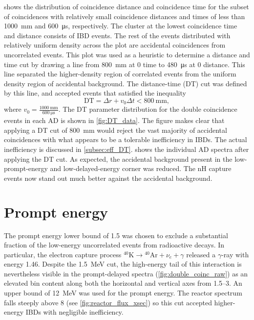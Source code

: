 shows the distribution of
coincidence distance and coincidence time
for the subset of  coincidences with
relatively small coincidence distances and times
of less than \SI{1000}{\milli\meter} and \SI{600}{\micro\second},
respectively.
The cluster at the lowest coincidence time and distance
consists of IBD events.
The rest of the events distributed with relatively uniform density
across the plot are accidental coincidences from uncorrelated events.
This plot was used as a heuristic to determine a distance and time cut
by drawing a line from \SI{800}{\milli\meter} at $0$ time
to \SI{480}{\micro\second} at $0$ distance.
This line separated the higher-density region
of correlated events from the uniform density region of accidental background.
The distance-time (DT) cut was defined by this line,
and accepted events that satisfied the inequality
\begin{equation}\label{eq:DT}
    \text{DT} = \Delta r + v_0 \Delta t < \SI{800}{\milli\meter},
\end{equation}
where $v_0 = \frac{\SI{1000}{\milli\meter}}{\SI{600}{\micro\second}}$.
The DT parameter distribution for the double coincidence events
in each AD is shown in \cref{fig:DT_data}.
The figure makes clear that applying a DT cut of \SI{800}{\mm}
would reject the vast majority of accidental coincidences
with what appears to be a tolerable inefficiency in IBDs.
The actual inefficiency is discussed in \cref{subsec:eff_DT}.
 shows the individual AD spectra
after applying the DT cut.
As expected, the accidental background present
in the low-prompt-energy and low-delayed-energy corner was reduced.
The nH capture events now stand out much better
against the accidental background.

\section{Prompt energy}
\label{subsec:prompt_energy}
The prompt energy lower bound of \SI{1.5}{\mev}
was chosen to exclude a substantial fraction
of the low-energy uncorrelated events from radioactive decays.
In particular, the electron capture process
${}^{40}\text{K} \to {}^{40}\text{Ar} + \nu_e + \gamma$
released a $\gamma$-ray with energy \SI{1.46}{\mev}.
Despite the \SI{1.5}{\MeV} cut,
the high-energy tail of this interaction is nevertheless visible in the prompt-delayed spectra
(\cref{fig:double_coinc_raw}) as an elevated bin content
along both the horizontal and vertical axes from \SIrange{1.5}{3}{\mev}.
An upper bound of \SI{12}{\MeV} was used for the prompt energy.
The reactor \nuebar{} spectrum falls steeply above \SI{8}{\mev}
(see \cref{fig:reactor_flux_xsec})
so this cut accepted higher-energy IBDs with negligible inefficiency.


